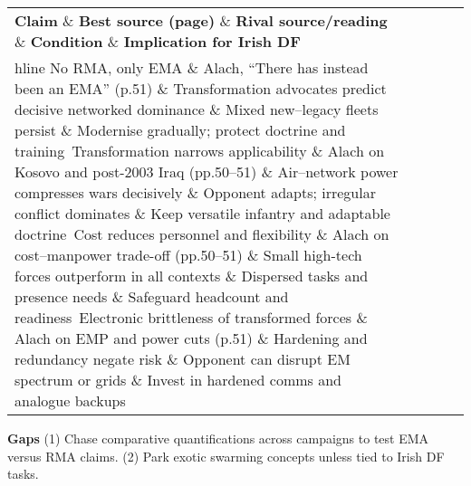 \begin{tabular}{p{3.2cm}p{4.2cm}p{3.6cm}p{3.2cm}p{4.2cm}}
	\textbf{Claim} \& \textbf{Best source (page)} \& \textbf{Rival source/reading} \& \textbf{Condition} \& \textbf{Implication for Irish DF}\\hline
	No RMA, only EMA \& Alach, “There has instead been an EMA” (p.51) \& Transformation advocates predict decisive networked dominance \& Mixed new–legacy fleets persist \& Modernise gradually; protect doctrine and training\
	Transformation narrows applicability \& Alach on Kosovo and post-2003 Iraq (pp.50–51) \& Air–network power compresses wars decisively \& Opponent adapts; irregular conflict dominates \& Keep versatile infantry and adaptable doctrine\
	Cost reduces personnel and flexibility \& Alach on cost–manpower trade-off (pp.50–51) \& Small high-tech forces outperform in all contexts \& Dispersed tasks and presence needs \& Safeguard headcount and readiness\
	Electronic brittleness of transformed forces \& Alach on EMP and power cuts (p.51) \& Hardening and redundancy negate risk \& Opponent can disrupt EM spectrum or grids \& Invest in hardened comms and analogue backups\
\end{tabular}

\textbf{Gaps}
(1) Chase comparative quantifications across campaigns to test EMA versus RMA claims.
(2) Park exotic swarming concepts unless tied to Irish DF tasks.


\parencite{BACHMANN_2023a_OODA}
